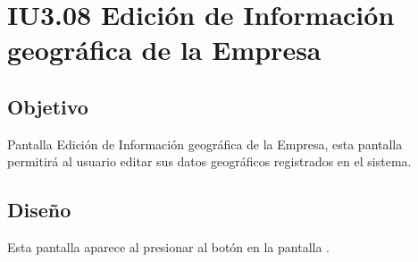\newpage
\section{IU3.08 Edición de Información geográfica de la Empresa}

\subsection{Objetivo}
	Pantalla Edición de Información geográfica de la Empresa, esta pantalla permitirá al usuario editar sus datos geográficos registrados en el sistema.
	


\subsection{Diseño}
	Esta pantalla aparece al presionar al botón  en la pantalla  .

	

